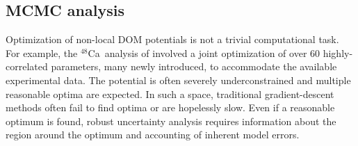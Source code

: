 \documentclass[twocolumn,secnumarabic,amssymb, nobibnotes, aps, prl,
superscriptaddress, nobalancelastpage]{revtex4}
\newcommand{\caEight}{\ensuremath{^{48}}C\lowercase{a}}
\begin{document}
\subsection{MCMC analysis}
Optimization of non-local DOM potentials is not a trivial computational task.
For example, the \caEight\ analysis of \cite{Mahzoon2017} involved a joint
optimization of over 60 highly-correlated parameters, many newly introduced, to
accommodate the available experimental data. The potential is
often severely underconstrained and multiple reasonable optima are expected.
In such a space, traditional gradient-descent methods often fail to find optima
or are hopelessly slow. Even if a reasonable optimum is found, robust
uncertainty analysis requires information about the region around the optimum and
accounting of inherent model errors.
\end{document}
